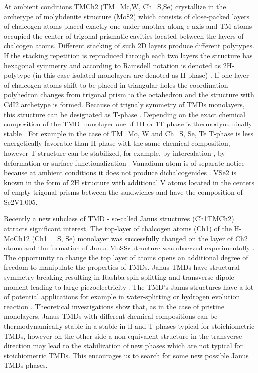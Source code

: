 \documentclass[a4paperm]{article}
\begin{document}
At ambient conditions TMCh2 (TM=Mo,W, Ch=S,Se) crystallize in the archetype of molybdenite structure (MoS2) which consists of close-packed layers of chalcogen atoms placed exactly one under another along c-axis and TM atoms occupied the center of trigonal prismatic cavities located between the layers of chalcogen atoms. Different stacking of such 2D layers produce different polytypes. If the stacking repetition is reproduced through each two layers the structure has hexagonal symmetry and according to Ramsdell notation is denoted as 2H-polytype (in this case isolated monolayers are denoted as H-phase) \cite{huang2020recent}. If one layer of chalcogen atoms shift to be placed in triangular holes the coordination polyhedron changes from trigonal prism to the octahedron and the structure with CdI2 archetype is formed. Because of trignaly symmetry of TMDs monolayers, this structure can be designated as T-phase \cite{huang2020recent}. Depending on the exact chemical composition of the TMD monolayer one of 1H or 1T phase is thermodynamically stable \cite{ataca2012stable}. For example in the case of TM=Mo, W and Ch=S, Se, Te T-phase is less energetically favorable than H-phase with the same chemical composition, however T structure can be stabilized, for example, by intercalation \cite{kan2014structures, wang2014atomic}, by deformation \cite{duerloo2014structural} or surface functionalization \cite{tang2015stabilization, voiry2015covalent}. Vanadium atom is of separate notice because at ambient conditions it does not produce dichalcogenides \cite{murphy1977preparation, le1979elaboration}. VSe2 is known in the form of 2H structure with additional V atoms located in the centers of empty trigonal prisms between the sandwiches and have the composition of Se2V1.005.

Recently a new subclass of TMD - so-called Janus structures (Ch1TMCh2) attracts significant interest. The top-layer of chalcogen atoms (Ch1) of the H-MoCh12 (Ch1 = S, Se) monolayer was successfully changed on the layer of Ch2 atoms and the formation of Janus MoSSe structure was observed experimentally \cite{lu2017, zhang2017janus}. The opportunity to change the top layer of atoms opens an additional degree of freedom to manipulate the properties of TMDs. Janus TMDs have structural symmetry breaking \cite{li2017electronic, van2020first} resulting in Rashba spin splitting \cite{hu2018intrinsic} and transverse dipole moment leading to large piezoelectricity \cite{dong2017large, li2018recent}. The TMD's Janus structures have a lot of potential applications for example in water-splitting \cite{xia2018universality, ma2018janus} or hydrogen evolution reaction \cite{er2018prediction, zhou2019janus}. Theoretical investigations show that, as in the case of pristine monolayers, Janus TMDs with different chemical compositions can be thermodynamically stable in a stable in H and T phases typical for stoichiometric TMDs, however on the other side a non-equivalent structure in the transverse direction may lead to the stabilization of new phases which are not typical for stoichiometric TMDs. This encourages us to search for some new possible Janus TMDs phases.
\end{document}
